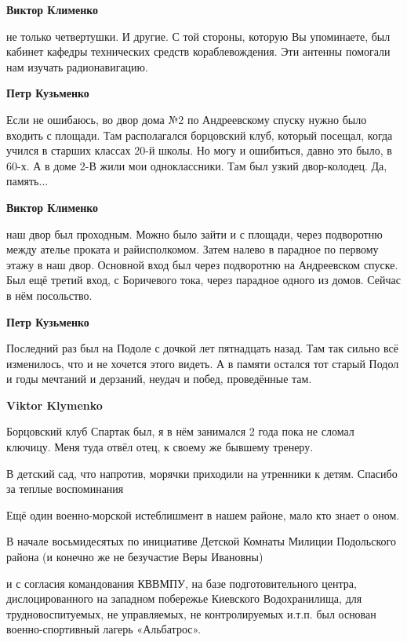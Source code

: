 \begin{itemize}
\begin{itemize}
\begin{itemize}
\textbf{Виктор Клименко} 

не только четвертушки. И другие. С той стороны, которую Вы упоминаете, был
кабинет кафедры технических средств кораблевождения. Эти антенны помогали нам
изучать радионавигацию.

\textbf{Петр Кузьменко}

Если не ошибаюсь, во двор дома №2 по Андреевскому спуску нужно было входить с
площади. Там располагался борцовский клуб, который посещал, когда учился в
старших классах 20-й школы. Но могу и ошибиться, давно это было, в 60-х. А в
доме 2-В жили мои одноклассники. Там был узкий двор-колодец. Да, память...

\textbf{Виктор Клименко} 

наш двор был проходным. Можно было зайти и с площади, через подворотню между
ателье проката и райисполкомом. Затем налево в парадное по первому этажу в наш
двор. Основной вход был через подворотню на Андреевском спуске. Был ещё третий
вход, с Боричевого тока, через парадное одного из домов. Сейчас в нём
посольство.

\textbf{Петр Кузьменко}

Последний раз был на Подоле с дочкой лет пятнадцать назад. Там так сильно всё
изменилось, что и не хочется этого видеть. А в памяти остался тот старый Подол
и годы мечтаний и дерзаний, неудач и побед, проведённые там.

\textbf{Viktor Klymenko}

Борцовский клуб Спартак был, я в нём занимался 2 года пока не сломал ключицу.
Меня туда отвёл отец, к своему же бывшему тренеру.
\end{itemize} %

\end{itemize} %

В детский сад, что напротив, морячки приходили на утренники к детям. Спасибо за
теплые воспоминания


Ещё один военно-морской истеблишмент в нашем районе, мало кто знает о оном.

В начале восьмидесятых по инициативе Детской Комнаты Милиции Подольского района
(и конечно же не безучастие Веры Ивановны)

и с согласия командования КВВМПУ, на базе подготовительного центра,
дислоцированного на западном побережье Киевского Водохранилища, для
трудновоспитуемых, не управляемых, не контролируемых и.т.п. был основан
военно-спортивный лагерь «Альбатрос».


\end{itemize}
